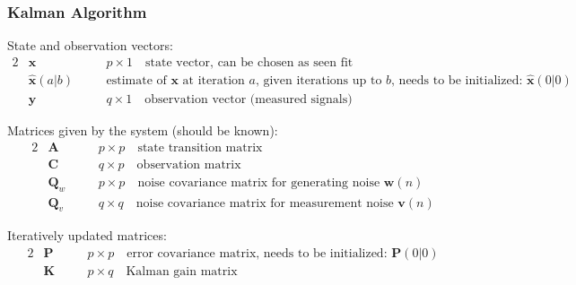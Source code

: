 \subsubsection{Kalman Algorithm}

State and observation vectors:
\vspace{-0.2cm}
\begin{alignat*}{2}
	& \mathbf{x} \quad && p \times 1 \quad \text{state vector, can be chosen as seen fit} \\
	& \mathbf{\hat x}(a|b) \quad && \text{estimate of } \mathbf{x} \text{ at iteration } a \text{, given iterations up to } b
		\text{, needs to be initialized: } \mathbf{\hat x}(0|0)\\
	& \mathbf{y} \quad && q \times 1 \quad \text{observation vector (measured signals)}
\end{alignat*}
\vspace{-0.5cm}

Matrices given by the system (should be known):
\vspace{-0.2cm}
\begin{alignat*}{2}
	& \mathbf{A} \quad && p \times p \quad \text{state transition matrix} \\
	& \mathbf{C} \quad && q \times p \quad \text{observation matrix} \\
	& \mathbf{Q}_w \quad && p \times p \quad \text{noise covariance matrix for generating noise } \mathbf{w}(n) \\
	& \mathbf{Q}_v \quad && q \times q \quad \text{noise covariance matrix for measurement noise } \mathbf{v}(n)
\end{alignat*}
\vspace{-0.5cm}

Iteratively updated matrices:
\vspace{-0.2cm}
\begin{alignat*}{2}
	& \mathbf{P} \quad && p \times p \quad \text{error covariance matrix, needs to be initialized: } \mathbf{P}(0|0) \\
	& \mathbf{K} \quad && p \times q \quad \text{Kalman gain matrix}
\end{alignat*}
\vspace{-0.5cm}

